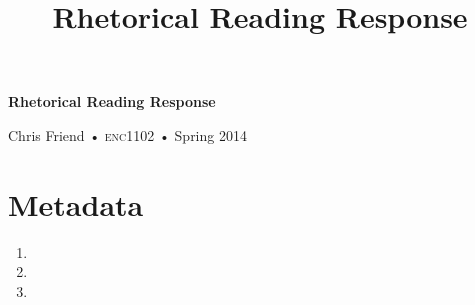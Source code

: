 \documentclass[10pt, oneside]{amsart}	%
\title[Reading Response]{Rhetorical Reading Response}
\begin{document}
%
\thispagestyle{empty}

\begin{center}
\huge

\textbf{Rhetorical Reading Response}

{\normalsize Chris Friend • \textsc{enc1102} • Spring 2014}
\end{center}

\section{Metadata} %
\label{sec:metadata}
\begin{Form}
	\begin{enumerate}
		\item {}
		\item {}
		\item {}
	\end{enumerate}
\end{Form}


\end{document}
